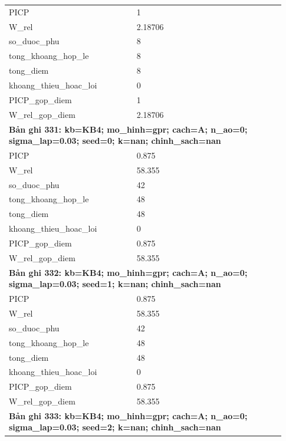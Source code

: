 \begin{longtable}{p{0.43\linewidth}p{0.50\linewidth}}
PICP & 1 \\
W\_\allowbreak rel & 2.18706 \\
so\_\allowbreak duoc\_\allowbreak phu & 8 \\
tong\_\allowbreak khoang\_\allowbreak hop\_\allowbreak le & 8 \\
tong\_\allowbreak diem & 8 \\
khoang\_\allowbreak thieu\_\allowbreak hoac\_\allowbreak loi & 0 \\
PICP\_\allowbreak gop\_\allowbreak diem & 1 \\
W\_\allowbreak rel\_\allowbreak gop\_\allowbreak diem & 2.18706 \\
\midrule
\multicolumn{2}{p{0.95\linewidth}}{\textbf{Bản ghi 331: kb=KB4; mo\_hinh=gpr; cach=A; n\_ao=0; sigma\_lap=0.03; seed=0; k=nan; chinh\_sach=nan}} \\
PICP & 0.875 \\
W\_\allowbreak rel & 58.355 \\
so\_\allowbreak duoc\_\allowbreak phu & 42 \\
tong\_\allowbreak khoang\_\allowbreak hop\_\allowbreak le & 48 \\
tong\_\allowbreak diem & 48 \\
khoang\_\allowbreak thieu\_\allowbreak hoac\_\allowbreak loi & 0 \\
PICP\_\allowbreak gop\_\allowbreak diem & 0.875 \\
W\_\allowbreak rel\_\allowbreak gop\_\allowbreak diem & 58.355 \\
\midrule
\multicolumn{2}{p{0.95\linewidth}}{\textbf{Bản ghi 332: kb=KB4; mo\_hinh=gpr; cach=A; n\_ao=0; sigma\_lap=0.03; seed=1; k=nan; chinh\_sach=nan}} \\
PICP & 0.875 \\
W\_\allowbreak rel & 58.355 \\
so\_\allowbreak duoc\_\allowbreak phu & 42 \\
tong\_\allowbreak khoang\_\allowbreak hop\_\allowbreak le & 48 \\
tong\_\allowbreak diem & 48 \\
khoang\_\allowbreak thieu\_\allowbreak hoac\_\allowbreak loi & 0 \\
PICP\_\allowbreak gop\_\allowbreak diem & 0.875 \\
W\_\allowbreak rel\_\allowbreak gop\_\allowbreak diem & 58.355 \\
\midrule
\multicolumn{2}{p{0.95\linewidth}}{\textbf{Bản ghi 333: kb=KB4; mo\_hinh=gpr; cach=A; n\_ao=0; sigma\_lap=0.03; seed=2; k=nan; chinh\_sach=nan}} \\

\end{longtable}
